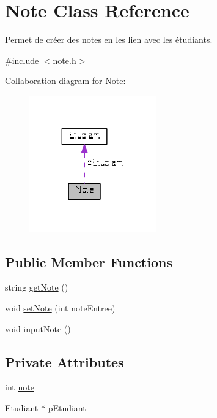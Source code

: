 \hypertarget{class_note}{\section{Note Class Reference}
\label{class_note}
}


Permet de créer des notes en les lien avec les étudiants.  




{\ttfamily \#include $<$note.\+h$>$}



Collaboration diagram for Note\+:
\nopagebreak
\begin{figure}[H]
\begin{center}
\leavevmode
\includegraphics[width=155pt]{class_note__coll__graph}
\end{center}
\end{figure}
\subsection*{Public Member Functions}
\begin{DoxyCompactItemize}
\item 
string \hyperlink{class_note_a48a8448ab0710a4445897d05a31c1efa}{get\+Note} ()
\item 
void \hyperlink{class_note_a0051b1bf8ab17897dcad83ba3e07e456}{set\+Note} (int note\+Entree)
\item 
void \hyperlink{class_note_a2232542d07b8c3657c0e43da23afaedf}{input\+Note} ()
\end{DoxyCompactItemize}
\subsection*{Private Attributes}
\begin{DoxyCompactItemize}
\item 
int \hyperlink{class_note_a3cb5f22dd5374f4e3c59c5f11dc7fbfb}{note}
\item 
\hyperlink{class_etudiant}{Etudiant} $\ast$ \hyperlink{class_note_a3ceec90c97d49215fe0eaa33e92a83d2}{p\+Etudiant}
\end{DoxyCompactItemize}



